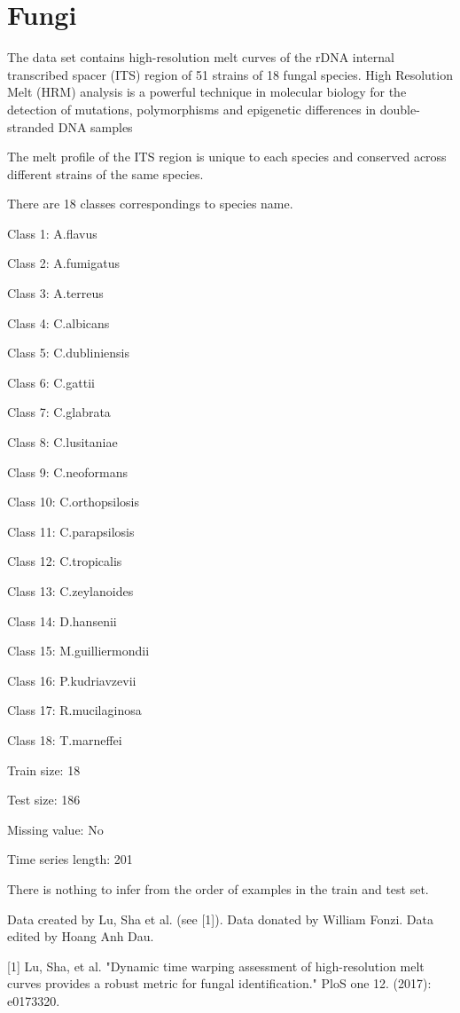 \chapter{Fungi}
\hypertarget{md_external_2data_2UCRArchive__2018_2Fungi_2README}{}\label{md_external_2data_2UCRArchive__2018_2Fungi_2README}
\label{md_external_2data_2UCRArchive__2018_2Fungi_2README_autotoc_md84}%
%
 The data set contains high-\/resolution melt curves of the r\+DNA internal transcribed spacer (ITS) region of 51 strains of 18 fungal species. High Resolution Melt (HRM) analysis is a powerful technique in molecular biology for the detection of mutations, polymorphisms and epigenetic differences in double-\/stranded DNA samples

The melt profile of the ITS region is unique to each species and conserved across different strains of the same species.

There are 18 classes correspondings to species name.


\begin{DoxyItemize}
\item Class 1\+: A.\+flavus
\item Class 2\+: A.\+fumigatus
\item Class 3\+: A.\+terreus
\item Class 4\+: C.\+albicans
\item Class 5\+: C.\+dubliniensis
\item Class 6\+: C.\+gattii
\item Class 7\+: C.\+glabrata
\item Class 8\+: C.\+lusitaniae
\item Class 9\+: C.\+neoformans
\item Class 10\+: C.\+orthopsilosis
\item Class 11\+: C.\+parapsilosis
\item Class 12\+: C.\+tropicalis
\item Class 13\+: C.\+zeylanoides
\item Class 14\+: D.\+hansenii
\item Class 15\+: M.\+guilliermondii
\item Class 16\+: P.\+kudriavzevii
\item Class 17\+: R.\+mucilaginosa
\item Class 18\+: T.\+marneffei
\end{DoxyItemize}

Train size\+: 18

Test size\+: 186

Missing value\+: No

Time series length\+: 201

There is nothing to infer from the order of examples in the train and test set.

Data created by Lu, Sha et al. (see \mbox{[}1\mbox{]}). Data donated by William Fonzi. Data edited by Hoang Anh Dau.

\mbox{[}1\mbox{]} Lu, Sha, et al. "{}\+Dynamic time warping assessment of high-\/resolution melt curves provides a robust metric for fungal identification."{} PloS one 12. (2017)\+: e0173320. 